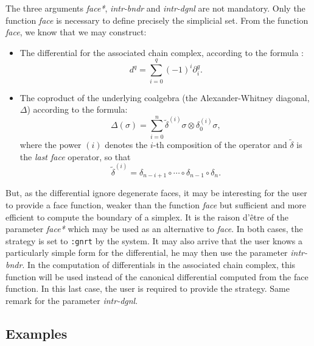 The three arguments {\em face*},  {\em intr-bndr} and {\em intr-dgnl} are not mandatory.
Only the function {\em face} is necessary to define precisely the simplicial set.
From the function {\em face}, we know that we may construct:
\begin{itemize} 
\item The differential for the associated chain complex,
according to the formula :
$$d^q = \sum_{i=0}^q { (-1)^i \partial_i^q}.$$
\item The coproduct of the underlying coalgebra (the Alexander-Whitney diagonal, $\Delta$) according to the
formula:
$$\Delta(\sigma)= \sum_{i=0}^{n}{{\tilde{\delta}}^{(i)}\sigma \otimes \delta_0^{(i)} \sigma},$$
where the power $(i)$ denotes the $i$-th composition of the operator and $\tilde{\delta}$ is the
{\em last face} operator, so that $${\tilde{\delta}}^{(i)}=\delta_{n-i+1}\circ \cdots \circ \delta_{n-1}\circ \delta_n.$$
\end{itemize}
But, as the differential ignore degenerate faces, it may be interesting for the user to provide a face function,
weaker than the function {\em face} but sufficient and more efficient to compute the boundary of a
simplex. It is the raison d'\^etre of the parameter {\em face*} which may be used as an alternative to {\em face}.
In both cases, the strategy is set to {\tt :gnrt} by the system. It may also arrive that the user knows
a particularly simple form for the differential, he may then use the parameter {\em intr-bndr}. In the computation
of differentials in the associated chain complex, this function will be used instead of the
canonical differential computed from the face function. In this last case, the user is required to provide
the strategy. Same remark for the parameter {\em intr-dgnl}.

\subsection* {Examples}

